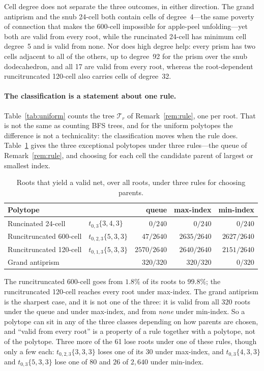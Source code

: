 \documentclass[11pt,letterpaper]{article}
\begin{document}
Cell degree does not separate the three outcomes, in either direction.
The grand antiprism and the snub 24-cell both contain cells of
degree~4---the same poverty of connection that makes the 600-cell
impossible for apple-peel unfolding---yet both are valid from every
root, while the runcinated 24-cell has minimum cell degree~5 and is
valid from none.
Nor does high degree help: every prism has two cells adjacent to all
of the others, up to degree~92 for the prism over the snub
dodecahedron, and all 17 are valid from every root, whereas the
root-dependent runcitruncated 120-cell also carries cells of
degree~32.

\paragraph{The classification is a statement about one rule.}
Table~\ref{tab:uniform} counts the tree $\mathcal{T}_r$ of
Remark~\ref{rem:rule}, one per root.
That is not the same as counting BFS trees, and for the uniform
polytopes the difference is not a technicality: the classification
moves when the rule does.
Table~\ref{tab:rules} gives the three exceptional polytopes under three
rules---the queue of Remark~\ref{rem:rule}, and choosing for each cell
the candidate parent of largest or smallest index.

\begin{table}[ht]
\centering
\caption{Roots that yield a valid net, over all roots, under three
  rules for choosing parents.}
\label{tab:rules}
\begin{tabular}{llrrr}
\toprule
Polytope & & queue & max-index & min-index\\
\midrule
Runcinated 24-cell        & $t_{0,3}\{3,4,3\}$    & $0/240$      & $0/240$      & $0/240$\\
Runcitruncated 600-cell   & $t_{0,2,3}\{5,3,3\}$  & $47/2640$    & $2635/2640$  & $2627/2640$\\
Runcitruncated 120-cell   & $t_{0,1,3}\{5,3,3\}$  & $2570/2640$  & $2640/2640$  & $2151/2640$\\
\midrule
Grand antiprism           &                       & $320/320$    & $320/320$    & $0/320$\\
\bottomrule
\end{tabular}
\end{table}

\noindent
The runcitruncated 600-cell goes from $1.8\%$ of its roots to $99.8\%$;
the runcitruncated 120-cell reaches every root under max-index.
The grand antiprism is the sharpest case, and it is not one of the
three: it is valid from all $320$ roots under the queue and under
max-index, and from \emph{none} under min-index.
So a polytope can sit in any of the three classes depending on how
parents are chosen, and ``valid from every root'' is a property of a
rule together with a polytope, not of the polytope.
Three more of the 61 lose roots under one of these rules, though only a
few each: $t_{0,2,3}\{3,3,3\}$ loses one of its $30$ under max-index,
and $t_{0,3}\{4,3,3\}$ and $t_{0,3}\{5,3,3\}$ lose one of $80$ and
$26$ of $2{,}640$ under min-index.
\end{document}

